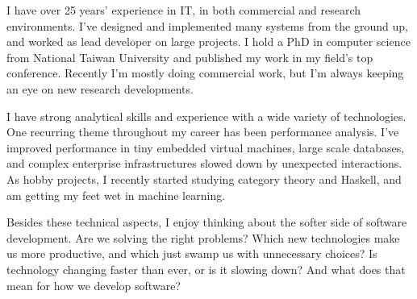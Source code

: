 \documentclass[10pt,a4paper]{../altacv}
\begin{document}

\begin{fullwidth}
\makecvheader

I have over 25 years’ experience in IT, in both commercial and research environments. I’ve designed and implemented many systems from the ground up, and worked as lead developer on large projects. I hold a PhD in computer science from National Taiwan University and published my work in my field’s top conference. Recently I'm mostly doing commercial work, but I’m always keeping an eye on new research developments.

\medskip

I have strong analytical skills and experience with a wide variety of technologies. One recurring theme throughout my career has been performance analysis. I’ve improved performance in tiny embedded virtual machines, large scale databases, and complex enterprise infrastructures slowed down by unexpected interactions. As hobby projects, I recently started studying category theory and Haskell, and am getting my feet wet in machine learning.

\medskip

Besides these technical aspects, I enjoy thinking about the softer side of software development. Are we solving the right problems? Which new technologies make us more productive, and which just swamp us with unnecessary choices? Is technology changing faster than ever, or is it slowing down? And what does that mean for how we develop software?

\end{fullwidth}

\small


\end{document}
